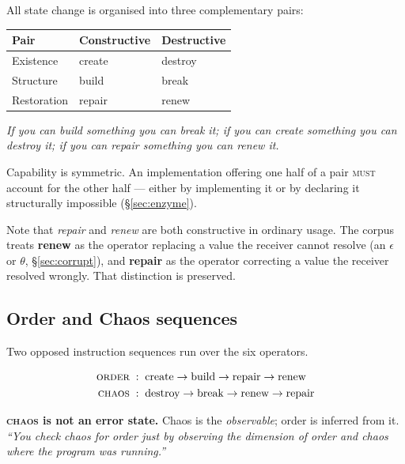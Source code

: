 \documentclass[11pt,a4paper]{article}
\newcommand{\MUST}{\textsc{must}}
\begin{document}
All state change is organised into three complementary pairs:

\begin{center}
\begin{tabular}{@{}lll@{}}
\toprule
\textbf{Pair} & \textbf{Constructive} & \textbf{Destructive} \\
\midrule
Existence   & create & destroy \\
Structure   & build  & break \\
Restoration & repair & renew \\
\bottomrule
\end{tabular}
\end{center}

\begin{ruleblock}
\emph{If you can build something you can break it; if you can create something
you can destroy it; if you can repair something you can renew it.}
\end{ruleblock}

Capability is symmetric. An implementation offering one half of a pair \MUST{}
account for the other half --- either by implementing it or by declaring it
structurally impossible (\S\ref{sec:enzyme}).

Note that \emph{repair} and \emph{renew} are both constructive in ordinary
usage. The corpus treats \textbf{renew} as the operator replacing a value the
receiver cannot resolve (an $\epsilon$ or $\theta$, \S\ref{sec:corrupt}), and
\textbf{repair} as the operator correcting a value the receiver resolved
wrongly. That distinction is preserved.

\subsection{Order and Chaos sequences}
\label{sec:orderchaos}

Two opposed instruction sequences run over the six operators.

\begin{align*}
\textsc{order} \;&:\; \text{create} \rightarrow \text{build} \rightarrow \text{repair} \rightarrow \text{renew} \\
\textsc{chaos} \;&:\; \text{destroy} \rightarrow \text{break} \rightarrow \text{renew} \rightarrow \text{repair}
\end{align*}

\begin{ruleblock}
\textbf{\textsc{chaos} is not an error state.} Chaos is the \emph{observable};
order is inferred from it. \emph{``You check chaos for order just by observing
the dimension of order and chaos where the program was running.''}
\end{ruleblock}
\end{document}
